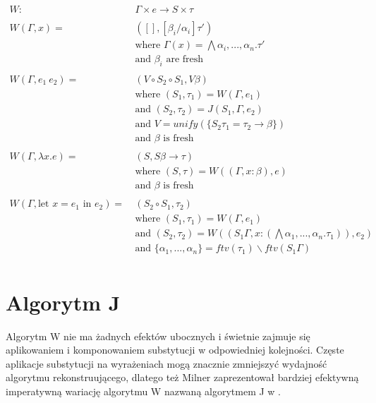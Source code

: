 \documentclass[a4paper,12pt]{book} %
\begin{document}
\begin{equation}
  \begin{split}
    W :&\ \Gamma\times e \rightarrow S\times\tau \\
    \\
    W(\Gamma,x) =&\  ([],[\beta_i/\alpha_i]\tau') \\
    &\ \text{where } \Gamma(x) = \bigwedge\alpha_i,...,\alpha_n.\tau' \\
    &\ \text{and } \beta_i \text{ are fresh} \\
    \\
    W(\Gamma,e_1\ e_2) =&\  (V\circ S_2\circ S_1,V\beta) \\
    &\ \text{where } (S_1,\tau_1) = W(\Gamma,e_1) \\
    &\ \text{and } (S_2,\tau_2)=J(S_1,\Gamma,e_2) \\
    &\ \text{and } V = unify(\{S_2\tau_1=\tau_2\rightarrow\beta\}) \\
    &\ \text{and } \beta \text{ is fresh} \\
    \\
    W(\Gamma,\lambda x.e) =&\  (S,S\beta\rightarrow\tau) \\
    &\ \text{where } (S,\tau)=W((\Gamma,x:\beta),e) \\
    &\ \text{and } \beta \text{ is fresh} \\
    \\
    W(\Gamma,\text{let }x=e_1\text{ in }e_2) =&\  (S_2\circ S_1,\tau_2) \\
    &\ \text{where } (S_1,\tau_1)=W(\Gamma,e_1) \\
    &\ \text{and } (S_2,\tau_2)=W((S_1\Gamma,x:(\bigwedge\alpha_1,...,\alpha_n.\tau_1)),e_2) \\
    &\ \text{and } \{\alpha_1,...,\alpha_n\}=ftv(\tau_1)\backslash ftv(S_1\Gamma) \\
  \end{split}
\end{equation}

\section{Algorytm J}
Algorytm W nie ma żadnych efektów ubocznych i świetnie zajmuje się aplikowaniem i komponowaniem substytucji w odpowiedniej kolejności. Częste aplikacje substytucji na wyrażeniach mogą znacznie zmniejszyć wydajność algorytmu rekonstruującego, dlatego też Milner zaprezentował bardziej efektywną imperatywną wariację algorytmu W nazwaną algorytmem J w \cite{Milner__1978}.
\end{document}
